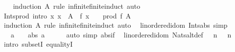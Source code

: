 \begin{isabellebody}
%
\isadelimproof
\ \ %
\endisadelimproof
%
\isatagproof
{}\isamarkupfalse%
\ {\isacharparenleft}{\kern0pt}induction\ A\ rule{\isacharcolon}{\kern0pt}\ infinite{\isacharunderscore}{\kern0pt}finite{\isacharunderscore}{\kern0pt}induct{\isacharparenright}{\kern0pt}\ auto%
\endisatagproof
{\isafoldproof}%
%
\isadelimproof
\isanewline
%
\endisadelimproof
\isanewline
{}\isamarkupfalse%
\ Ints{\isacharunderscore}{\kern0pt}prod\ {\isacharbrackleft}{\kern0pt}intro{\isacharbrackright}{\kern0pt}{\isacharcolon}{\kern0pt}\ {\isachardoublequoteopen}{\isacharparenleft}{\kern0pt}{\isasymAnd}x{\isachardot}{\kern0pt}\ x\ {\isasymin}\ A\ {\isasymLongrightarrow}\ f\ x\ {\isasymin}\ {\isasymint}{\isacharparenright}{\kern0pt}\ {\isasymLongrightarrow}\ prod\ f\ A\ {\isasymin}\ {\isasymint}{\isachardoublequoteclose}\isanewline
%
\isadelimproof
\ \ %
\endisadelimproof
%
\isatagproof
{}\isamarkupfalse%
\ {\isacharparenleft}{\kern0pt}induction\ A\ rule{\isacharcolon}{\kern0pt}\ infinite{\isacharunderscore}{\kern0pt}finite{\isacharunderscore}{\kern0pt}induct{\isacharparenright}{\kern0pt}\ auto%
\endisatagproof
{\isafoldproof}%
%
\isadelimproof
\isanewline
%
\endisadelimproof
\isanewline
{}\isamarkupfalse%
\ {\isacharparenleft}{\kern0pt}\ linordered{\isacharunderscore}{\kern0pt}idom{\isacharparenright}{\kern0pt}\ Ints{\isacharunderscore}{\kern0pt}abs\ {\isacharbrackleft}{\kern0pt}simp{\isacharbrackright}{\kern0pt}{\isacharcolon}{\kern0pt}\isanewline
\ \ \ {\isachardoublequoteopen}a\ {\isasymin}\ {\isasymint}\ {\isasymLongrightarrow}\ abs\ a\ {\isasymin}\ {\isasymint}{\isachardoublequoteclose}\isanewline
%
\isadelimproof
\ \ %
\endisadelimproof
%
\isatagproof
{}\isamarkupfalse%
\ {\isacharparenleft}{\kern0pt}auto\ simp{\isacharcolon}{\kern0pt}\ abs{\isacharunderscore}{\kern0pt}if{\isacharparenright}{\kern0pt}%
\endisatagproof
{\isafoldproof}%
%
\isadelimproof
\isanewline
%
\endisadelimproof
\isanewline
{}\isamarkupfalse%
\ {\isacharparenleft}{\kern0pt}\ linordered{\isacharunderscore}{\kern0pt}idom{\isacharparenright}{\kern0pt}\ Nats{\isacharunderscore}{\kern0pt}altdef{}{\isacharcolon}{\kern0pt}\ {\isachardoublequoteopen}{\isasymnat}\ {\isacharequal}{\kern0pt}\ {\isacharbraceleft}{\kern0pt}n\ {\isasymin}\ {\isasymint}{\isachardot}{\kern0pt}\ n\ {\isasymge}\ {}{\isacharbraceright}{\kern0pt}{\isachardoublequoteclose}\isanewline
%
\isadelimproof
%
\endisadelimproof
%
\isatagproof
{}\isamarkupfalse%
\ {\isacharparenleft}{\kern0pt}intro\ subsetI\ equalityI{\isacharparenright}{\kern0pt}\isanewline

\end{isabellebody}
